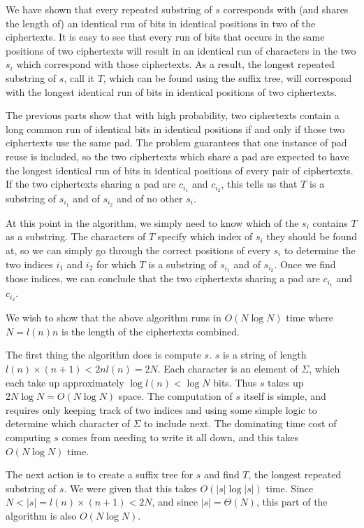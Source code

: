 \documentclass[11pt]{article}
\begin{document}
We have shown that every repeated substring of $s$ corresponds with (and shares the length of) an identical run of bits in identical positions in two of the ciphertexts. It is easy to see that every run of bits that occurs in the same positions of two ciphertexts will result in an identical run of characters in the two $s_i$ which correspond with those ciphertexts. As a result, the longest repeated substring of $s$, call it $T$, which can be found using the suffix tree, will correspond with the longest identical run of bits in identical positions of two ciphertexts.

The previous parts show that with high probability, two ciphertexts contain a long common run of identical bits in identical positions if and only if those two ciphertexts use the same pad. The problem guarantees that one instance of pad reuse is included, so the two ciphertexts which share a pad are expected to have the longest identical run of bits in identical positions of every pair of ciphertexts. If the two ciphertexts sharing a pad are $c_{i_1}$ and $c_{i_2}$, this tells us that $T$ is a substring of $s_{i_1}$ and of $s_{i_2}$ and of no other $s_i$. 

At this point in the algorithm, we simply need to know which of the $s_i$ contains $T$ as a substring. The characters of $T$ specify which index of $s_i$ they should be found at, so we can simply go through the correct positions of every $s_i$ to determine the two indices $i_1$ and $i_2$ for which $T$ is a substring of $s_{i_1}$ and of $s_{i_2}$. Once we find those indices, we can conclude that the two ciphertexts sharing a pad are $c_{i_1}$ and $c_{i_2}$.

We wish to show that the above algorithm runs in $O(N \log N)$ time where $N = l(n)n$ is the length of the ciphertexts combined.

The first thing the algorithm does is compute $s$. $s$ is a string of length $l(n)\times (n+1) < 2nl(n) = 2N$. Each character is an element of $\Sigma$, which each take up approximately $\log l(n) < \log N$ bits. Thus $s$ takes up $2N \log N = O(N \log N)$ space. The computation of $s$ itself is simple, and requires only keeping track of two indices and using some simple logic to determine which character of $\Sigma$ to include next. The dominating time cost of computing $s$ comes from needing to write it all down, and this takes $O(N \log N)$ time. 

The next action is to create a suffix tree for $s$ and find $T$, the longest repeated substring of $s$. We were given that this takes $O(|s| \log |s|)$ time. Since $N < |s| = l(n) \times(n+1) < 2N$, and since $|s| = \Theta(N)$, this part of the algorithm is also $O(N \log N)$. 
\end{document}
